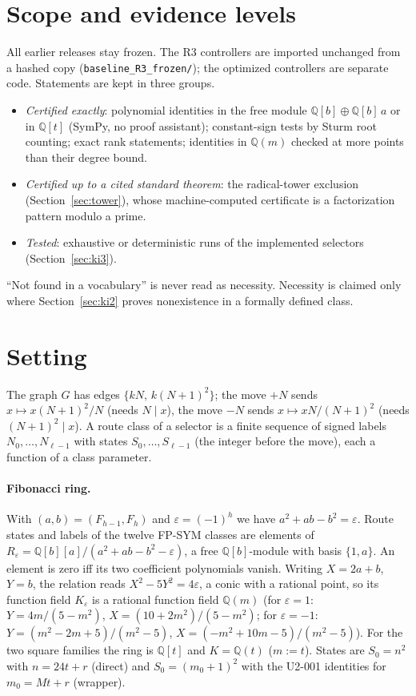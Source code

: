 \documentclass[11pt]{article}
\theoremstyle{definition}
\theoremstyle{remark}
\newcommand{\Q}{\mathbb{Q}}
\begin{document}
\section{Scope and evidence levels}
All earlier releases stay frozen. The R3 controllers are imported unchanged from a hashed copy (\texttt{baseline\_R3\_frozen/}); the optimized controllers are separate code. Statements are kept in three groups.
\begin{itemize}\setlength\itemsep{1pt}
\item \emph{Certified exactly}: polynomial identities in the free module $\Q[b]\oplus\Q[b]\,a$ or in $\Q[t]$ (SymPy, no proof assistant); constant-sign tests by Sturm root counting; exact rank statements; identities in $\Q(m)$ checked at more points than their degree bound.
\item \emph{Certified up to a cited standard theorem}: the radical-tower exclusion (Section~\ref{sec:tower}), whose machine-computed certificate is a factorization pattern modulo a prime.
\item \emph{Tested}: exhaustive or deterministic runs of the implemented selectors (Section~\ref{sec:ki3}).
\end{itemize}
``Not found in a vocabulary'' is never read as necessity. Necessity is claimed only where Section~\ref{sec:ki2} proves nonexistence in a formally defined class.

\section{Setting}\label{sec:setting}
The graph $G$ has edges $\{kN,\,k(N+1)^2\}$; the move $+N$ sends $x\mapsto x(N+1)^2/N$ (needs $N\mid x$), the move $-N$ sends $x\mapsto xN/(N+1)^2$ (needs $(N+1)^2\mid x$). A route class of a selector is a finite sequence of signed labels $N_0,\dots,N_{\ell-1}$ with states $S_0,\dots,S_{\ell-1}$ (the integer before the move), each a function of a class parameter.

\paragraph{Fibonacci ring.} With $(a,b)=(F_{h-1},F_h)$ and $\varepsilon=(-1)^h$ we have $a^2+ab-b^2=\varepsilon$. Route states and labels of the twelve FP-SYM classes are elements of $R_\varepsilon=\Q[b][a]/(a^2+ab-b^2-\varepsilon)$, a free $\Q[b]$-module with basis $\{1,a\}$. An element is zero iff its two coefficient polynomials vanish. Writing $X=2a+b$, $Y=b$, the relation reads $X^2-5Y^2=4\varepsilon$, a conic with a rational point, so its function field $K_\varepsilon$ is a rational function field $\Q(m)$ (for $\varepsilon=1$: $Y=4m/(5-m^2)$, $X=(10+2m^2)/(5-m^2)$; for $\varepsilon=-1$: $Y=(m^2-2m+5)/(m^2-5)$, $X=(-m^2+10m-5)/(m^2-5)$). For the two square families the ring is $\Q[t]$ and $K=\Q(t)$ ($m:=t$). States are $S_0=n^2$ with $n=24t+r$ (direct) and $S_0=(m_0+1)^2$ with the U2-001 identities for $m_0=Mt+r$ (wrapper).
\end{document}
